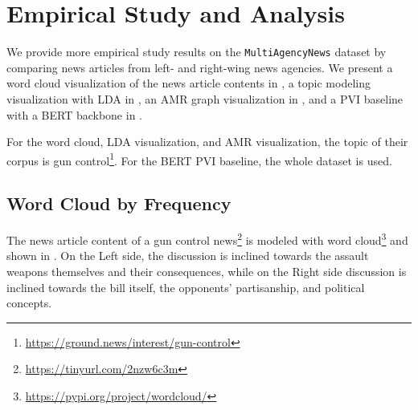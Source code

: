 \chapter{Empirical Study and Analysis}
We provide more empirical study results on the \texttt{MultiAgencyNews} dataset by comparing news articles from left- and right-wing news agencies. We present a word cloud visualization of the news article contents in , a topic modeling visualization with LDA in , an AMR graph visualization in , and a PVI baseline with a BERT backbone in . 

For the word cloud, LDA visualization, and AMR visualization, the topic of their corpus is gun control\footnote{\url{https://ground.news/interest/gun-control}}. For the BERT PVI baseline, the whole dataset is used.

\section{Word Cloud by Frequency}
\label{empirical-wordcloud}
The news article content of a gun control news\footnote{\url{https://tinyurl.com/2nzw6c3m}} is modeled with word cloud\footnote{\url{https://pypi.org/project/wordcloud/}} and shown in . On the Left side, the discussion is inclined towards the assault weapons themselves and their consequences, while on the Right side discussion is inclined towards the bill itself, the opponents' partisanship, and political concepts.

